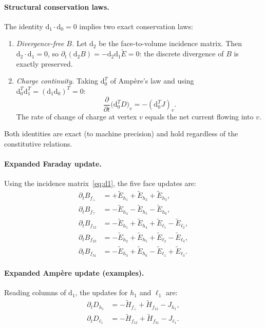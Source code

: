 \documentclass[11pt,a4paper]{article}
\newcommand{\dd}{\mathrm{d}}
\begin{document}
\paragraph{Structural conservation laws.}
The identity $\dd_1 \cdot \dd_0 = 0$ implies two exact conservation laws:
\begin{enumerate}[nosep]
  \item \emph{Divergence-free $B$.} Let $\dd_2$ be the face-to-volume incidence
    matrix. Then $\dd_2 \cdot \dd_1 = 0$, so
    $\partial_t (\dd_2 B) = -\dd_2 \dd_1 \widetilde{E} = 0$: the discrete
    divergence of $B$ is exactly preserved.
  \item \emph{Charge continuity.} Taking $\dd_0^T$ of
    Amp\`ere's law and using
    $\dd_0^T \dd_1^T = (\dd_1 \dd_0)^T = 0$:
    \begin{equation}
      \frac{\partial}{\partial t}\bigl(\dd_0^T D\bigr)_v
        = -(\dd_0^T J)_v.
      \label{eq:discrete_continuity}
    \end{equation}
    The rate of change of charge at vertex $v$ equals the net current flowing
    into $v$.
\end{enumerate}
Both identities are exact (to machine precision) and hold regardless of the
constitutive relations.

\paragraph{Expanded Faraday update.}
Using the incidence matrix~\eqref{eq:d1}, the five face updates are:
\begin{align}
  \partial_t B_{f_\bot}
    &= +\widetilde{E}_{h_1} + \widetilde{E}_{h_2}
      + \widetilde{E}_{h_3}, \nonumber\\
  \partial_t B_{f_\top}
    &= -\widetilde{E}_{h_4} - \widetilde{E}_{h_5}
      - \widetilde{E}_{h_6}, \nonumber\\
  \partial_t B_{f_{12}}
    &= -\widetilde{E}_{h_1} + \widetilde{E}_{h_4}
      + \widetilde{E}_{\ell_1} - \widetilde{E}_{\ell_2}, \nonumber\\
  \partial_t B_{f_{23}}
    &= -\widetilde{E}_{h_2} + \widetilde{E}_{h_5}
      + \widetilde{E}_{\ell_2} - \widetilde{E}_{\ell_3}, \nonumber\\
  \partial_t B_{f_{31}}
    &= -\widetilde{E}_{h_3} + \widetilde{E}_{h_6}
      - \widetilde{E}_{\ell_1} + \widetilde{E}_{\ell_3}.
  \label{eq:faraday_expanded}
\end{align}

\paragraph{Expanded Amp\`ere update (examples).}
Reading columns of $\dd_1$, the updates for $h_1$ and $\ell_1$ are:
\begin{align}
  \partial_t D_{h_1} &= -\widetilde{H}_{f_\bot}
    + \widetilde{H}_{f_{12}} - J_{h_1}, \\
  \partial_t D_{\ell_1} &= -\widetilde{H}_{f_{12}}
    + \widetilde{H}_{f_{31}} - J_{\ell_1}.
\end{align}
\end{document}
